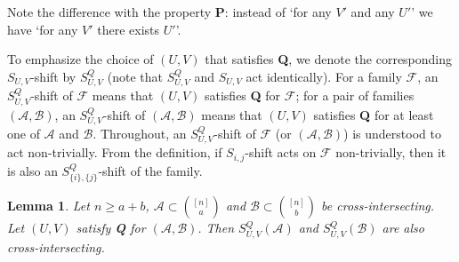 \documentclass[11pt]{article}
\newcommand{\m}{\mathcal}
\newtheorem{lemma}[theorem]{Lemma}
\begin{document}
Note the difference with the property {\bf P}: instead of `for any $V'$ and any $U'$' we have `for any $V'$ there exists $U'$'.


To emphasize the choice of $(U,V)$ that satisfies {\bf Q}, we denote the corresponding $S_{U,V}$-shift by $S_{U,V}^Q$ (note that $S_{U,V}^Q$ and $S_{U,V}$ act identically).
For a family $\m F$, an $S_{U,V}^Q$-shift of $\m F$ means that $(U,V)$ satisfies {\bf Q} for $\m F$;
for a pair of families $(\mathcal A,\mathcal B)$,
an $S_{U,V}^Q$-shift of $(\mathcal A,\mathcal B)$
means that $(U,V)$ satisfies {\bf Q} 
for at least one of $\mathcal A$ and $\mathcal B$.
Throughout, an $S_{U,V}^Q$-shift of $\m F$ (or $(\mathcal A,\mathcal B)$) is understood to act non-trivially. 
From the definition, if $S_{i,j}$-shift acts on $\m F$ non-trivially, then it is also an $S_{\{i\},\{j\}}^Q$-shift of the family.


\begin{lemma}\label{SUV'}
Let $n\ge a+b$, \(\mathcal{A}\subset {[n]\choose a}\) and \(\mathcal{B}\subset {[n]\choose b}\) be cross-intersecting. 
Let $(U,V)$ satisfy {\bf Q} for $(\m A, \m B)$. Then \(S_{U,V}^{Q}(\mathcal{A})\) and \(S_{U,V}^{Q}(\mathcal{B})\) are also cross-intersecting.
\end{lemma}
\end{document}
